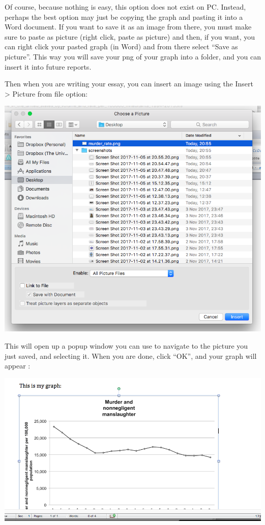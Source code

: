 \documentclass[
]{book}
\begin{document}
Of course, because nothing is easy, this option does not exist on PC. Instead, perhaps the best option may just be copying the graph and pasting it into a Word document. If you want to save it as an image from there, you must make sure to paste as picture (right click, paste as picture) and then, if you want, you can right click your pasted graph (in Word) and from there select ``Save as picture''. This way you will save your png of your graph into a folder, and you can insert it into future reports.

Then when you are writing your essay, you can insert an image using the Insert \textgreater{} Picture from file option:

\includegraphics{imgs/find_pic.png}

This will open up a popup window you can use to navigate to the picture you just saved, and selecting it. When you are done, click ``OK'', and your graph will appear :

\includegraphics{imgs/inserted_graph.png}
\end{document}
